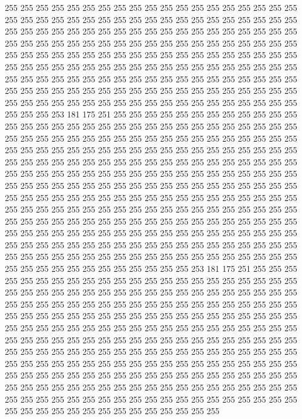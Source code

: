 255 255 255 255 255 255 255 255 255 255 255 255 255 255 255 255 255 255 255 255
255 255 255 255 255 255 255 255 255 255 255 255 255 255 255 255 255 255 255 255
255 255 255 255 255 255 255 255 255 255 255 255 255 255 255 255 255 255 255 255
255 255 255 255 255 255 255 255 255 255 255 255 255 255 255 255 255 255 255 255
255 255 255 255 255 255 255 255 255 255 255 255 255 255 255 255 255 255 255 255
255 255 255 255 255 255 255 255 255 255 255 255 255 255 255 255 255 255 255 255
255 255 255 255 255 255 255 255 255 255 255 255 255 255 255 255 255 255 255 255
255 255 255 255 255 255 255 255 255 255 255 255 255 255 255 255 255 255 255 255
255 255 255 255 255 255 255 255 255 255 255 255 255 255 253 181 175 251 255 255
255 255 255 255 255 255 255 255 255 255 255 255 255 255 255 255 255 255 255 255
255 255 255 255 255 255 255 255 255 255 255 255 255 255 255 255 255 255 255 255
255 255 255 255 255 255 255 255 255 255 255 255 255 255 255 255 255 255 255 255
255 255 255 255 255 255 255 255 255 255 255 255 255 255 255 255 255 255 255 255
255 255 255 255 255 255 255 255 255 255 255 255 255 255 255 255 255 255 255 255
255 255 255 255 255 255 255 255 255 255 255 255 255 255 255 255 255 255 255 255
255 255 255 255 255 255 255 255 255 255 255 255 255 255 255 255 255 255 255 255
255 255 255 255 255 255 255 255 255 255 255 255 255 255 255 255 255 255 255 255
255 255 255 255 255 255 255 255 255 255 255 255 255 255 255 255 255 255 255 255
255 255 255 255 255 255 255 255 255 255 255 255 255 255 255 255 255 255 255 255
255 255 255 255 255 255 255 255 255 255 255 255 255 255 255 255 255 255 255 255
255 255 255 255 255 255 255 255 255 255 255 255 255 255 255 255 255 255 255 255
255 255 255 255 255 255 255 255 255 255 253 181 175 251 255 255 255 255 255 255
255 255 255 255 255 255 255 255 255 255 255 255 255 255 255 255 255 255 255 255
255 255 255 255 255 255 255 255 255 255 255 255 255 255 255 255 255 255 255 255
255 255 255 255 255 255 255 255 255 255 255 255 255 255 255 255 255 255 255 255
255 255 255 255 255 255 255 255 255 255 255 255 255 255 255 255 255 255 255 255
255 255 255 255 255 255 255 255 255 255 255 255 255 255 255 255 255 255 255 255
255 255 255 255 255 255 255 255 255 255 255 255 255 255 255 255 255 255 255 255
255 255 255 255 255 255 255 255 255 255 255 255 255 255 255 255 255 255 255 255
255 255 255 255 255 255 255 255 255 255 255 255 255 255 255 255 255 255 255 255
255 255 255 255 255 255 255 255 255 255 255 255 255 255 255 255 255 255 255 255
255 255 255 255 255 255 255 255 255 255 255 255 255 255 255 255 255 255 255 255
255 255 255 255 255 255 255 255 255 255 255 255 255 255 255 255 255 255 255 255
